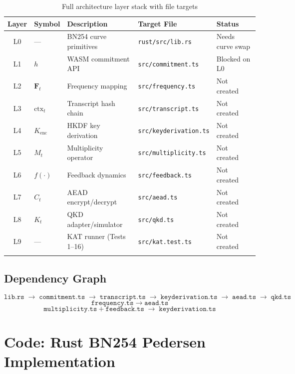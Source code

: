 \documentclass[11pt,letterpaper]{article}
\begin{document}
\begin{longtable}{@{}cllll@{}}
\toprule
\textbf{Layer} & \textbf{Symbol} & \textbf{Description} & \textbf{Target File} & \textbf{Status} \\
\midrule
\endhead
L0 & --- & BN254 curve primitives & \texttt{rust/src/lib.rs} & Needs curve swap \\
L1 & \(h\) & WASM commitment API & \texttt{src/commitment.ts} & Blocked on L0 \\
L2 & \(\mathbf{F}_t\) & Frequency mapping & \texttt{src/frequency.ts} & Not created \\
L3 & \(\text{ctx}_t\) & Transcript hash chain & \texttt{src/transcript.ts} & Not created \\
L4 & \(K_{\text{enc}}\) & HKDF key derivation & \texttt{src/keyderivation.ts} & Not created \\
L5 & \(M_t\) & Multiplicity operator & \texttt{src/multiplicity.ts} & Not created \\
L6 & \(f(\cdot)\) & Feedback dynamics & \texttt{src/feedback.ts} & Not created \\
L7 & \(C_t\) & AEAD encrypt/decrypt & \texttt{src/aead.ts} & Not created \\
L8 & \(K_t\) & QKD adapter/simulator & \texttt{src/qkd.ts} & Not created \\
L9 & --- & KAT runner (Tests 1--16) & \texttt{src/kat.test.ts} & Not created \\
\bottomrule
\caption{Full architecture layer stack with file targets}
\end{longtable}

\subsection{Dependency Graph}

\[
  \texttt{lib.rs} \;\to\; \texttt{commitment.ts} \;\to\; \texttt{transcript.ts}
  \;\to\; \texttt{keyderivation.ts} \;\to\; \texttt{aead.ts}
  \;\to\; \texttt{qkd.ts}
\]
\[
  \texttt{frequency.ts} \;\to\; \texttt{aead.ts}
\]
\[
  \texttt{multiplicity.ts} + \texttt{feedback.ts} \;\to\; \texttt{keyderivation.ts}
\]

\section{Code: Rust BN254 Pedersen Implementation}
\end{document}
